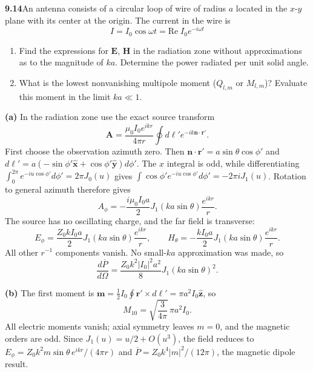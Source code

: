 \par\bigskip
\noindent\textbf{9.14}\quad An antenna consists of a circular loop of wire of radius $a$ located in the $x$-$y$ plane with its center at the origin. The current in the wire is
\[
I=I_{0}\cos\omega t=\mathrm{Re}\;I_{0}e^{-i\omega t}
\]
\begin{enumerate}
\item[(a)] Find the expressions for $\mathbf{E}$, $\mathbf{H}$ in the radiation zone without approximations as to the magnitude of $ka$. Determine the power radiated per unit solid angle.
\item[(b)] What is the lowest nonvanishing multipole moment ($Q_{l,m}$ or $M_{l,m}$)? Evaluate this moment in the limit $ka\ll1$.
\end{enumerate}
\solution

\textbf{(a)} In the radiation zone use the exact source transform
\[
\mathbf A=\frac{\mu_0I_0e^{ikr}}{4\pi r}
\oint d\boldsymbol\ell' e^{-ik\mathbf n\cdot\mathbf r'}.
\]
First choose the observation azimuth zero. Then
$\mathbf n\cdot\mathbf r'=a\sin\theta\cos\phi'$ and
$d\boldsymbol\ell'=a(-\sin\phi'\hat{\mathbf x}
+\cos\phi'\hat{\mathbf y})d\phi'$.
The $x$ integral is odd, while differentiating
$\int_0^{2\pi}e^{-iu\cos\phi'}d\phi'=2\pi J_0(u)$ gives
$\int\cos\phi'e^{-iu\cos\phi'}d\phi'=-2\pi iJ_1(u)$.
Rotation to general azimuth therefore gives
\[
A_\phi=-\frac{i\mu_0I_0a}{2}J_1(ka\sin\theta)\frac{e^{ikr}}r.
\]
The source has no oscillating charge, and the far field is transverse:
\[
\boxed{E_\phi=\frac{Z_0kI_0a}{2}J_1(ka\sin\theta)\frac{e^{ikr}}r,
\qquad H_\theta=-\frac{kI_0a}{2}J_1(ka\sin\theta)\frac{e^{ikr}}r.}
\]
All other $r^{-1}$ components vanish. No small-$ka$ approximation was
made, so
\[
\boxed{\frac{d\overline P}{d\Omega}
=\frac{Z_0k^2|I_0|^2a^2}{8}J_1(ka\sin\theta)^2.}
\]

\textbf{(b)} The first moment is
$\mathbf m=\tfrac12I_0\oint\mathbf r'\times d\boldsymbol\ell'
=\pi a^2I_0\hat{\mathbf z}$, so
\[
\boxed{M_{10}=\sqrt{\frac3{4\pi}}\,\pi a^2I_0.}
\]
All electric moments vanish; axial symmetry leaves $m=0$, and the
magnetic orders are odd. Since $J_1(u)=u/2+O(u^3)$, the field reduces
to $E_\phi=Z_0k^2m\sin\theta\,e^{ikr}/(4\pi r)$ and
$\overline P=Z_0k^4|m|^2/(12\pi)$, the magnetic dipole result.

